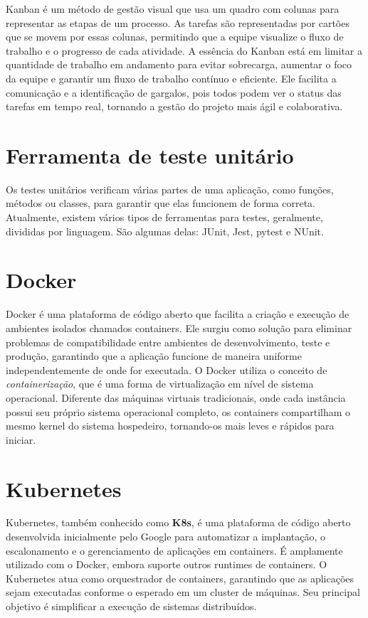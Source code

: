 \documentclass[12pt,a4paper]{article}
\begin{document}
Kanban é um método de gestão visual que usa um quadro com colunas para representar as etapas de um processo.
As tarefas são representadas por cartões que se movem por essas colunas, permitindo que a equipe visualize o fluxo
de trabalho e o progresso de cada atividade. A essência do Kanban está em limitar a quantidade de trabalho em andamento
para evitar sobrecarga, aumentar o foco da equipe e garantir um fluxo de trabalho contínuo e eficiente. Ele facilita
a comunicação e a identificação de gargalos, pois todos podem ver o status das tarefas em tempo real, tornando a
gestão do projeto mais ágil e colaborativa.



\section{Ferramenta de teste unitário}

Os testes unitários verificam várias partes de uma aplicação, como funções, métodos ou classes, para garantir que elas
funcionem de forma correta. Atualmente, existem vários tipos de ferramentas para testes, geralmente, divididas por linguagem.
São algumas delas: JUnit, Jest, pytest e NUnit.



\section{Docker}

Docker é uma plataforma de código aberto que facilita a criação e execução de ambientes isolados chamados containers.
Ele surgiu como solução para eliminar problemas de compatibilidade entre ambientes de desenvolvimento, teste e produção,
garantindo que a aplicação funcione de maneira uniforme independentemente de onde for executada.
O Docker utiliza o conceito de \textit{containerização}, que é uma forma de virtualização em nível de sistema operacional.
Diferente das máquinas virtuais tradicionais, onde cada instância possui seu próprio sistema operacional completo, os containers
compartilham o mesmo kernel do sistema hospedeiro, tornando-os mais leves e rápidos para iniciar.



\section{Kubernetes}

Kubernetes, também conhecido como \textbf{K8s}, é uma plataforma de código aberto desenvolvida inicialmente pelo Google para
automatizar a implantação, o escalonamento e o gerenciamento de aplicações em containers. É amplamente utilizado com o Docker,
embora suporte outros runtimes de containers. O Kubernetes atua como orquestrador de containers, garantindo que as aplicações
sejam executadas conforme o esperado em um cluster de máquinas. Seu principal objetivo é simplificar a execução de sistemas
distribuídos.
\end{document}
